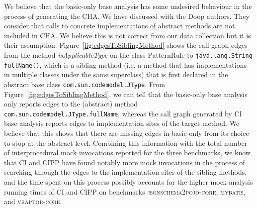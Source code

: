 We believe that the basic-only base analysis has some undesired behaviour in the process of generating the CHA. We have discussed with the Doop authors. They consider that calls to concrete implementations of abstract methods are not included in CHA. We believe this is not correct from our data collection but it is their assumption. Figure~\ref{fig:edgesToSiblingMethod} shows the call graph edges from the method \textit{isApplicableType} on the class PatternRule to \texttt{java.lang.String fullName()}, which is a sibling method (i.e. a method that has implementations in multiple classes under the same superclass) that is first declared in the abstract base class \texttt{com.sun.codemodel.JType}. From Figure~\ref{fig:edgesToSiblingMethod}, we can tell that the basic-only base analysis only reports edges to the (abstract) method \texttt{com.sun.codemodel.JType.fullName}, whereas the call graph generated by CI base analysis reports edges to implementation sites of the target method. We believe that this shows that there are missing edges in basic-only from its choice to stop at the abstract level. Combining this information with the total number of interprocedural mock invocations reported for the three benchmarks, we know that CI and CIPP have found notably more mock invocations in the process of searching through the edges to the implementation sites of the sibling methods, and the time spent on this process possibly accounts for the higher mock-analysis running times of CI and CIPP on benchmarks \textsc{jsonschema2pojo-core}, \textsc{mybatis}, and \textsc{vraptor-core}.


